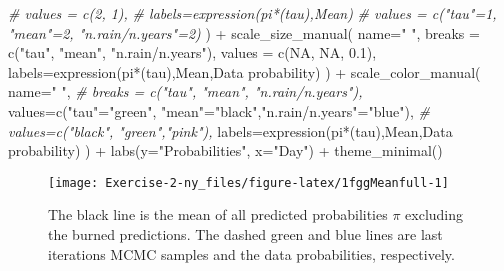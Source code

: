 \documentclass[
]{article}
\newenvironment{Shaded}{\begin{snugshade}}{\end{snugshade}}
\newcommand{\AttributeTok}[1]{\textcolor[rgb]{0.77,0.63,0.00}{#1}}
\newcommand{\CommentTok}[1]{\textcolor[rgb]{0.56,0.35,0.01}{\textit{#1}}}
\newcommand{\ConstantTok}[1]{\textcolor[rgb]{0.00,0.00,0.00}{#1}}
\newcommand{\FloatTok}[1]{\textcolor[rgb]{0.00,0.00,0.81}{#1}}
\newcommand{\FunctionTok}[1]{\textcolor[rgb]{0.00,0.00,0.00}{#1}}
\newcommand{\NormalTok}[1]{#1}
\newcommand{\OtherTok}[1]{\textcolor[rgb]{0.56,0.35,0.01}{#1}}
\newcommand{\SpecialCharTok}[1]{\textcolor[rgb]{0.00,0.00,0.00}{#1}}
\newcommand{\StringTok}[1]{\textcolor[rgb]{0.31,0.60,0.02}{#1}}
\begin{document}
\begin{Shaded}
\begin{Highlighting}[]
    \CommentTok{\# values = c(2, 1),}
    \CommentTok{\# labels=expression(pi*(tau),\textquotesingle{}Mean\textquotesingle{})}
    \CommentTok{\# values = c("tau"=1, "mean"=2, "n.rain/n.years"=2)}
\NormalTok{  ) }\SpecialCharTok{+}
  \FunctionTok{scale\_size\_manual}\NormalTok{(}
    \AttributeTok{name=}\StringTok{" "}\NormalTok{,}
    \AttributeTok{breaks =} \FunctionTok{c}\NormalTok{(}\StringTok{"tau"}\NormalTok{, }\StringTok{"mean"}\NormalTok{, }\StringTok{"n.rain/n.years"}\NormalTok{),}
    \AttributeTok{values =} \FunctionTok{c}\NormalTok{(}\ConstantTok{NA}\NormalTok{, }\ConstantTok{NA}\NormalTok{, }\FloatTok{0.1}\NormalTok{),}
    \AttributeTok{labels=}\FunctionTok{expression}\NormalTok{(pi}\SpecialCharTok{*}\NormalTok{(tau),}\StringTok{\textquotesingle{}Mean\textquotesingle{}}\NormalTok{,}\StringTok{\textquotesingle{}Data probability\textquotesingle{}}\NormalTok{)}
\NormalTok{    ) }\SpecialCharTok{+}
  \FunctionTok{scale\_color\_manual}\NormalTok{(}
    \AttributeTok{name=}\StringTok{" "}\NormalTok{,}
    \CommentTok{\# breaks = c("tau", "mean", "n.rain/n.years"),}
    \AttributeTok{values=}\FunctionTok{c}\NormalTok{(}\StringTok{"tau"}\OtherTok{=}\StringTok{"green"}\NormalTok{, }\StringTok{"mean"}\OtherTok{=}\StringTok{"black"}\NormalTok{,}\StringTok{"n.rain/n.years"}\OtherTok{=}\StringTok{"blue"}\NormalTok{),}
    \CommentTok{\# values=c("black", "green","pink"),}
    \AttributeTok{labels=}\FunctionTok{expression}\NormalTok{(pi}\SpecialCharTok{*}\NormalTok{(tau),}\StringTok{\textquotesingle{}Mean\textquotesingle{}}\NormalTok{,}\StringTok{\textquotesingle{}Data probability\textquotesingle{}}\NormalTok{)}
\NormalTok{  ) }\SpecialCharTok{+}
  \FunctionTok{labs}\NormalTok{(}\AttributeTok{y=}\StringTok{"Probabilities"}\NormalTok{, }\AttributeTok{x=}\StringTok{"Day"}\NormalTok{) }\SpecialCharTok{+}
  \FunctionTok{theme\_minimal}\NormalTok{()}
\end{Highlighting}
\end{Shaded}

\begin{figure}

{\centering \texttt{[image: Exercise-2-ny\_files/figure-latex/1fggMeanfull-1]} 

}

\caption{The black line is the mean of all predicted probabilities $\pi$ excluding the burned predictions. The dashed green and blue lines are last iterations MCMC samples and the data probabilities, respectively.}\label{fig:1fggMeanfull}
\end{figure}
\end{document}
